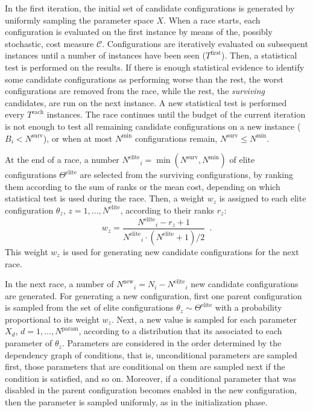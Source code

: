 \documentclass[a4paper]{article}
\newcommand{\iter}{\ensuremath{i}\xspace}
\newcommand{\Budget}{\ensuremath{B}\xspace}
\newcommand{\Budgeti}{\ensuremath{\Budget_{\iter}}\xspace}
\newcommand{\Ncand}[1][]{\ensuremath{N_{#1}}\xspace}
\newcommand{\Nparam}{\ensuremath{{N^\text{param}}}\xspace}
\newcommand{\Nmin}{\ensuremath{N^\text{min}}\xspace}
\newcommand{\Nsurv}{\ensuremath{N^\text{surv}}\xspace}
\newcommand{\Nelite}{\ensuremath{N^\text{elite}}\xspace}
\newcommand{\Nnew}{\ensuremath{N^\text{new}}\xspace}
\newcommand{\Celite}{\ensuremath{\Theta^\text{elite}}\xspace}
\newcommand{\parameter}[1]{\hyperlink{opt:#1}{\texttt{#1}}}
\begin{document}
\newcommand{\Tfirst}{\ensuremath{T^\text{first}}\xspace}
\newcommand{\Teach}{\ensuremath{T^\text{each}}\xspace}

In the first iteration, the initial set of candidate configurations is
generated by uniformly sampling the parameter space $X$. When a race
starts, each configuration is evaluated on the first instance by means of
the, possibly stochastic, cost measure $\mathcal{C}$. Configurations
are iteratively evaluated on subsequent instances until a number of
instances have been seen ($\Tfirst$). Then, a statistical
test is performed on the results. If there is enough statistical
evidence to identify some candidate configurations as performing worse
than the rest, the worst configurations are removed from the
race, while the rest, the \emph{surviving} candidates, are run on the
next instance. A new statistical test is performed every $\Teach$
instances.
%
The race continues until the budget of the current iteration is not enough to
test all remaining candidate configurations on a new instance
($\Budgeti < \Nsurv$), or when at most $\Nmin$ configurations remain,
$\Nsurv \leq \Nmin$. 

At the end of a race, a number $\Nelite_i = \min(\Nsurv, \Nmin)$ of
elite configurations $\Celite$ are selected from the
surviving configurations, by ranking them according to the sum of
ranks or the mean cost, depending on which statistical test is used
during the race. Then, a weight $w_z$ is assigned to each elite
configuration $\theta_z$, $z=1,\dotsc, \Nelite$, according to their
ranks $r_z$:
%
\begin{equation}\label{eq:weight}
  w_z = \frac{\Nelite_i - r_z + 1}{\Nelite_i \cdot (\Nelite + 1) /2}\enspace.
\end{equation}
%
This weight $w_z$ is used for generating new candidate configurations
for the next race. 

In the next race, a number of $\Nnew_i = \Ncand[\iter] - \Nelite_i$ new
candidate configurations are generated. For generating a new
configuration, first one parent configuration is
sampled from the set of elite configurations $\theta_z\sim\Celite$
with a probability proportional to its weight $w_z$. Next, a new value
is sampled for each parameter $X_d$, $d=1,\dotsc,\Nparam$, according
to a distribution that its associated to each parameter of
$\theta_z$. Parameters are considered in the order determined by the
dependency graph of conditions, that is, unconditional parameters are
sampled first, those parameters that are conditional on them are
sampled next if the condition is satisfied, and so on. Moreover, if a conditional parameter that was disabled in the
parent configuration becomes enabled in the new configuration, then
the parameter is sampled uniformly, as in the initialization phase.
\end{document}
